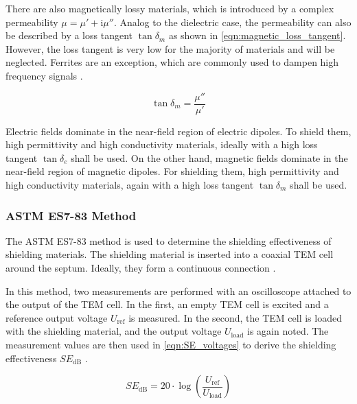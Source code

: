 There are also magnetically lossy materials, which is introduced by a complex permeability $\mu=\mu'+\mathrm{i}\mu''$. Analog to the dielectric case, the permeability can also be described by a loss tangent $\tan{\delta_m}$ as shown in \autoref{eqn:magnetic_loss_tangent}. However, the loss tangent is very low for the majority of materials and will be neglected. Ferrites are an exception, which are commonly used to dampen high frequency signals \cite{Balanis_2012}.

\begin{equation}
    \tan{\delta_m}=\frac{\mu''}{\mu'}
    \label{eqn:magnetic_loss_tangent}
\end{equation}



Electric fields dominate in the near-field region of electric dipoles. To shield them, high permittivity and high conductivity materials, ideally with a high loss tangent $\tan\delta_e$ shall be used. On the other hand, magnetic fields dominate in the near-field region of magnetic dipoles. For shielding them, high permittivity and high conductivity materials, again with a high loss tangent $\tan\delta_m$ shall be used.

\subsubsection{ASTM ES7-83 Method}

The ASTM ES7-83 method is used to determine the shielding effectiveness of shielding materials. The shielding material is inserted into a coaxial TEM cell around the septum. Ideally, they form a continuous connection \cite{MORARI_BĂLAN_2015}. 

In this method, two measurements are performed with an oscilloscope attached to the output of the TEM cell. In the first, an empty TEM cell is excited and a reference output voltage $U_\mathrm{ref}$ is measured. In the second, the TEM cell is loaded with the shielding material, and the output voltage $U_\mathrm{load}$ is again noted. The measurement values are then used in \autoref{eqn:SE_voltages} to derive the shielding effectiveness $SE_\mathrm{dB}$ \cite{MORARI_BĂLAN_2015}.

\begin{equation}
    SE_\mathrm{dB}=20\cdot\log{\left(\frac{U_\mathrm{ref}}{U_\mathrm{load}}\right)}
    \label{eqn:SE_voltages}
\end{equation}

